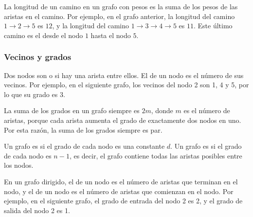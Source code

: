 La longitud de un camino en un grafo con pesos
es la suma de los pesos de las aristas en el camino.
Por ejemplo, en el grafo anterior,
la longitud del camino
$1 \rightarrow 2 \rightarrow 5$ es $12$,
y la longitud del camino
$1 \rightarrow 3 \rightarrow 4 \rightarrow 5$ es $11$.
Este último camino es el  desde
el nodo $1$ hasta el nodo $5$.

\subsubsection{Vecinos y grados}


Dos nodos son  o 
si hay una arista entre ellos.
El  de un nodo
es el número de sus vecinos.
Por ejemplo, en el siguiente grafo,
los vecinos del nodo 2 son 1, 4 y 5,
por lo que su grado es 3.

\begin{center}
\end{center}

La suma de los grados en un grafo siempre es $2m$,
donde $m$ es el número de aristas,
porque cada arista
aumenta el grado de exactamente dos nodos en uno.
Por esta razón, la suma de los grados siempre es par.


Un grafo es  si el
grado de cada nodo es una constante $d$.
Un grafo es  si el
grado de cada nodo es $n-1$, es decir,
el grafo contiene todas las aristas posibles
entre los nodos.


En un grafo dirigido, el 
de un nodo es el número de aristas
que terminan en el nodo,
y el  de un nodo
es el número de aristas que comienzan en el nodo.
Por ejemplo, en el siguiente grafo,
el grado de entrada del nodo 2 es 2,
y el grado de salida del nodo 2 es 1.

